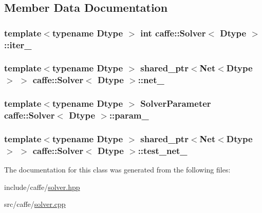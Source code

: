 \subsection{Member Data Documentation}
\hypertarget{classcaffe_1_1_solver_ade2a806f82be02b91f3c7c08d234dbbb}{
\subsubsection[{iter\+\_\+}]{\setlength{\rightskip}{0pt plus 5cm}template$<$typename Dtype $>$ int {\bf caffe\+::\+Solver}$<$ Dtype $>$\+::iter\+\_\+\hspace{0.3cm}{\ttfamily [protected]}}}\label{classcaffe_1_1_solver_ade2a806f82be02b91f3c7c08d234dbbb}
\hypertarget{classcaffe_1_1_solver_a93c9e9a8c4d0fd56432b12daf75dea04}{
\subsubsection[{net\+\_\+}]{\setlength{\rightskip}{0pt plus 5cm}template$<$typename Dtype $>$ shared\+\_\+ptr$<${\bf Net}$<$Dtype$>$ $>$ {\bf caffe\+::\+Solver}$<$ Dtype $>$\+::net\+\_\+\hspace{0.3cm}{\ttfamily [protected]}}}\label{classcaffe_1_1_solver_a93c9e9a8c4d0fd56432b12daf75dea04}
\hypertarget{classcaffe_1_1_solver_a718d67175eba4eb6195b19ef38c3f17a}{
\subsubsection[{param\+\_\+}]{\setlength{\rightskip}{0pt plus 5cm}template$<$typename Dtype $>$ Solver\+Parameter {\bf caffe\+::\+Solver}$<$ Dtype $>$\+::param\+\_\+\hspace{0.3cm}{\ttfamily [protected]}}}\label{classcaffe_1_1_solver_a718d67175eba4eb6195b19ef38c3f17a}
\hypertarget{classcaffe_1_1_solver_af24f195f59c68f08fcef0526d051e77d}{
\subsubsection[{test\+\_\+net\+\_\+}]{\setlength{\rightskip}{0pt plus 5cm}template$<$typename Dtype $>$ shared\+\_\+ptr$<${\bf Net}$<$Dtype$>$ $>$ {\bf caffe\+::\+Solver}$<$ Dtype $>$\+::test\+\_\+net\+\_\+\hspace{0.3cm}{\ttfamily [protected]}}}\label{classcaffe_1_1_solver_af24f195f59c68f08fcef0526d051e77d}


The documentation for this class was generated from the following files\+:\begin{DoxyCompactItemize}
\item 
include/caffe/\hyperlink{solver_8hpp}{solver.\+hpp}\item 
src/caffe/\hyperlink{solver_8cpp}{solver.\+cpp}\end{DoxyCompactItemize}
